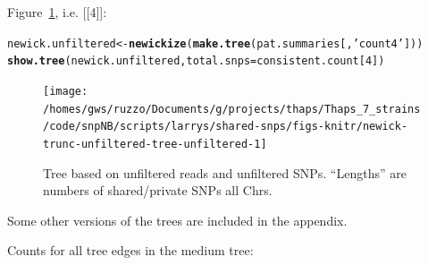 \documentclass{article}\usepackage[]{graphicx}\usepackage[]{color}
\makeatletter
\newcommand{\hlnum}[1]{\textcolor[rgb]{0.686,0.059,0.569}{#1}}%
\newcommand{\hlstr}[1]{\textcolor[rgb]{0.192,0.494,0.8}{#1}}%
\newcommand{\hlstd}[1]{\textcolor[rgb]{0.345,0.345,0.345}{#1}}%
\newcommand{\hlkwb}[1]{\textcolor[rgb]{0.69,0.353,0.396}{#1}}%
\newcommand{\hlkwc}[1]{\textcolor[rgb]{0.333,0.667,0.333}{#1}}%
\newcommand{\hlkwd}[1]{\textcolor[rgb]{0.737,0.353,0.396}{\textbf{#1}}}%
\newenvironment{kframe}{%
 \def\at@end@of@kframe{}%
 \ifinner\ifhmode%
  \def\at@end@of@kframe{\end{minipage}}%
  \begin{minipage}{\columnwidth}%
 \fi\fi%
 \def\FrameCommand##1{\hskip\@totalleftmargin \hskip-\fboxsep
 \colorbox{shadecolor}{##1}\hskip-\fboxsep
     \hskip-\linewidth \hskip-\@totalleftmargin \hskip\columnwidth}%
 \MakeFramed {\advance\hsize-\width
   \@totalleftmargin\z@ \linewidth\hsize
   \@setminipage}}%
 {\par\unskip\endMakeFramed%
 \at@end@of@kframe}
\newenvironment{knitrout}{}{} %
\makeatother
\begin{document}
Figure~\ref{fig:tree-unfiltered}, i.e. [[4]]:

\begin{knitrout}\scriptsize
{}\color{fgcolor}\begin{kframe}
\begin{alltt}
\hlstd{newick.unfiltered} \hlkwb{<-} \hlkwd{newickize}\hlstd{(}\hlkwd{make.tree}\hlstd{(pat.summaries[,}\hlstr{'count4'}\hlstd{]))}
\hlkwd{show.tree}\hlstd{(newick.unfiltered,} \hlkwc{total.snps}\hlstd{=consistent.count[}\hlnum{4}\hlstd{])}
\end{alltt}
\end{kframe}\begin{figure}

{\centering \texttt{[image: /homes/gws/ruzzo/Documents/g/projects/thaps/Thaps\_7\_strains/code/snpNB/scripts/larrys/shared-snps/figs-knitr/newick-trunc-unfiltered-tree-unfiltered-1]} 

}

\caption[Tree based on unfiltered reads and unfiltered SNPs]{Tree based on unfiltered reads and unfiltered SNPs.  ``Lengths'' are numbers of shared/private SNPs all Chrs.}\label{fig:tree-unfiltered}
\end{figure}


\end{knitrout}

Some other versions of the trees are included in the appendix.

Counts for all tree edges in the medium tree: 
\end{document}
